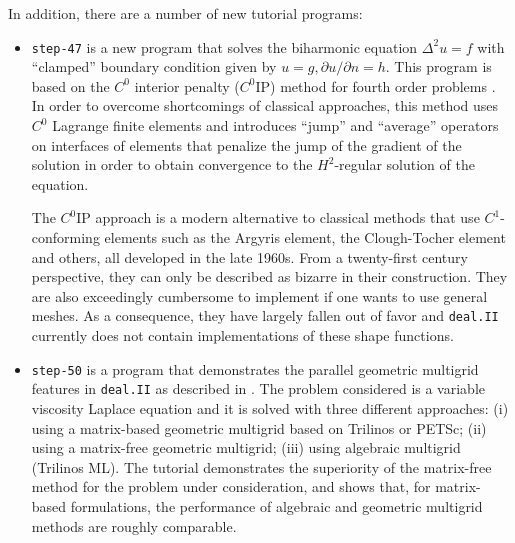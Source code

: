 \documentclass{ansarticle-preprint}
\newcommand{\specialword}[1]{\texttt{#1}}
\newcommand{\dealii}{{\specialword{deal.II}}\xspace}
\begin{document}
In addition, there are a number of new tutorial programs:
\begin{itemize}
  \item \texttt{step-47} is a new program that solves the biharmonic
        equation $\Delta^2 u = f$ with
        ``clamped'' boundary condition given by $u=g, \partial u/\partial
          n=h$. This program is based on the $C^0$ interior
        penalty ($C^0$IP) method for fourth order problems
        \cite{Brenner2005}. In order to overcome
        shortcomings of classical approaches, this method uses $C^0$ Lagrange finite
        elements and introduces ``jump'' and ``average'' operators on
        interfaces of elements that penalize the jump of the gradient of the
        solution in order to obtain convergence to the $H^2$-regular
        solution of the equation.

        The $C^0$IP approach is a modern alternative to classical methods that
        use $C^1$-conforming elements such as the Argyris
        element, the Clough-Tocher element and others, all developed in the
        late 1960s. From a twenty-first century perspective, they can only be
        described as bizarre in their construction. They are also exceedingly
        cumbersome to implement if one wants to use general meshes. As a
        consequence, they have largely fallen out of favor and \dealii{} currently
        does not contain implementations of these shape functions.

  \item \texttt{step-50} is a program that demonstrates the parallel geometric multigrid features
  in \dealii{} as described in \cite{ClevengerHeisterKanschatKronbichler2019}.
  The problem considered is a variable viscosity Laplace equation and it is solved
  with three different approaches:
  (i) using a matrix-based geometric multigrid based on Trilinos or
  PETSc; (ii) using a matrix-free
  geometric multigrid; (iii) using algebraic multigrid (Trilinos ML). The tutorial
  demonstrates the superiority of the matrix-free method for the problem under consideration,
  and shows that, for matrix-based formulations, the performance of algebraic and
  geometric multigrid methods are roughly comparable.



\end{itemize}
\end{document}
